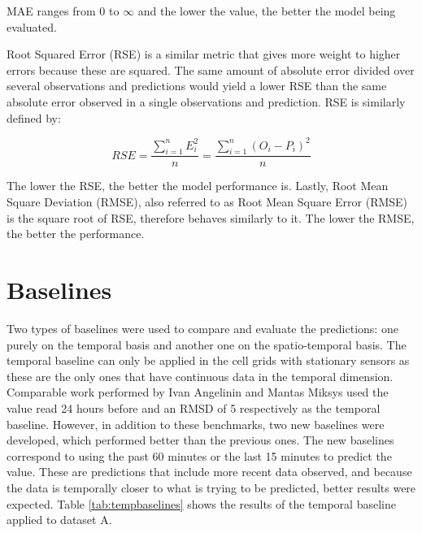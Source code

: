 MAE ranges from 0 to $\infty$ and the lower the value, the better the model being evaluated.

Root Squared Error (RSE) is a similar metric that gives more weight to higher errors because these are squared. The same amount of absolute error divided over several observations and predictions would yield a lower RSE than the same absolute error observed in a single observations and prediction. RSE is similarly defined by: 

\[RSE = \frac{\sum_{i=1}^{n} E_i^2}{n} = \frac{\sum_{i=1}^{n} (O_i-P_i)^2}{n}\]

The lower the RSE, the better the model performance is. Lastly, Root Mean Square Deviation (RMSE), also referred to as Root Mean Square Error (RMSE) is the square root of RSE, therefore behaves similarly to it. The lower the RMSE, the better the performance.


\section{Baselines}
\label{chap:baselines}

Two types of baselines were used to compare and evaluate the predictions: one purely on the temporal basis and another one on the spatio-temporal basis.
The temporal baseline can only be applied in the cell grids with stationary sensors as these are the only ones that have continuous data in the temporal dimension.
Comparable work performed by Ivan Angelinin and Mantas Miksys used the value read 24 hours before and an RMSD of 5 respectively as the temporal baseline.
However, in addition to these benchmarks, two new baselines were developed, which performed better than the previous ones. The new baselines correspond to using the past 60 minutes or the last 15 minutes to predict the value. These are predictions that include more recent data observed, and because the data is temporally closer to what is trying to be predicted, better results were expected. Table \ref{tab:tempbaselines} shows the results of the temporal baseline applied to dataset A.

